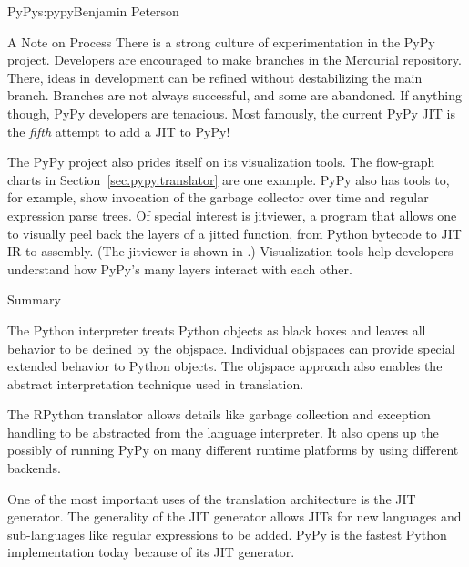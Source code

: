 \begin{aosachapter}{PyPy}{s:pypy}{Benjamin Peterson}
\begin{aosasect1}{A Note on Process}
There is a strong culture of experimentation in the PyPy project. Developers are
encouraged to make branches in the Mercurial repository. There, ideas in
development can be refined without destabilizing the main branch. Branches are
not always successful, and some are abandoned. If anything though, PyPy
developers are tenacious. Most famously, the current PyPy JIT is the
\emph{fifth} attempt to add a JIT to PyPy!

The PyPy project also prides itself on its visualization tools. The flow-graph
charts in Section~\ref{sec.pypy.translator} are one example. 
PyPy also has tools to,
for example, show invocation of the garbage collector over time and regular
expression parse trees. Of special interest is jitviewer, a program that
allows one to visually peel back the layers of a jitted function, from Python bytecode
to JIT IR to assembly. (The jitviewer is shown in
.) Visualization tools help developers
understand how PyPy's many layers interact with each other.


\end{aosasect1}

\begin{aosasect1}{Summary}

The Python interpreter treats Python objects as black boxes and leaves all
behavior to be defined by the objspace. Individual objspaces can provide special
extended behavior to Python objects. The objspace approach also enables the
abstract interpretation technique used in translation.

The RPython translator allows details like garbage collection and exception
handling to be abstracted from the language interpreter. It also opens up the
possibly of running PyPy on many different runtime platforms by using different
backends.

One of the most important uses of the translation architecture is the JIT
generator. The generality of the JIT generator allows JITs for new languages and
sub-languages like regular expressions to be added. PyPy is the fastest Python
implementation today because of its JIT generator.


\end{aosasect1}
\end{aosachapter}
